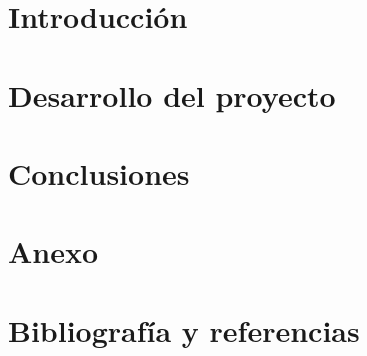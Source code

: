 \documentclass[12pt,a4paper]{book}
\begin{document}
\frontmatter











\mainmatter


\part{Introducción}



\part{Desarrollo del proyecto}





\part{Conclusiones}



\part{Anexo}
\appendix



\backmatter
\part{Bibliografía y referencias}

\end{document}
